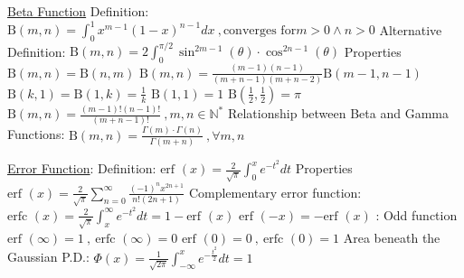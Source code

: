 \documentclass[12pt]{article}
\def\erf{\text{erf\ }} %
\def\erfc{\text{erfc\ }} %
\newcommand{\Beta}{\mathrm{B}} %
\begin{document}
\begin{flushleft}
	\uline{Beta Function} \linebreak 
	\textbullet \quad Definition: $\displaystyle \Beta (m,n) = \int_0^1 x^{m-1} (1-x)^{n-1} dx \ , \text{converges for} m>0 \land n >0$ \linebreak 
	\textbullet \quad Alternative Definition: $\displaystyle \Beta (m,n) = 2\int_0^{\pi/2} \sin ^{2m-1} (\theta) \cdot \cos ^{2n-1} (\theta)$ \linebreak 
	Properties \linebreak 
	\textbullet \quad $\Beta (m,n) = \Beta (n,m)$ \linebreak 
	\textbullet \quad $\displaystyle \Beta (m,n) = \frac{(m-1)(n-1)}{(m+n-1)(m+n-2)} \Beta (m-1,n-1) $ \linebreak 
	\textbullet \quad $\displaystyle \Beta (k,1) = \Beta (1,k) = \frac{1}{k}$ \linebreak 
	\textbullet \quad $\Beta(1,1) = 1$ \linebreak 
	\textbullet \quad $\displaystyle \Beta(\frac{1}{2} , \frac{1}{2} ) = \pi $ \linebreak 
	\textbullet \quad $\displaystyle \Beta (m,n) = \frac{(m-1)! (n-1)!}{(m+n-1)!} \ , m,n \in \mathbb{N}^*$ \linebreak 
	\textbullet \quad Relationship between Beta and Gamma Functions: \linebreak 
	$\displaystyle \Beta (m,n) = \frac{\Gamma(m) \cdot \Gamma (n)}{\Gamma (m+n)} \ , \forall m,n $ \linebreak 
	
	\uline{Error Function}: \linebreak 
	\textbullet \quad Definition: $\displaystyle \erf (x) = \frac{2}{\sqrt{\pi}} \int_0^x e^{-t^2} dt$ \linebreak 
	Properties \linebreak 
	\textbullet \quad $\displaystyle \erf (x) = \frac{2}{\sqrt{\pi}} \sum \limits_{n=0}^{\infty} \frac{(-1)^n x^{2n+1}}{n! (2n+1)} $ \linebreak 
	\textbullet \quad Complementary error function: $\displaystyle \erfc (x) = \frac{2}{\sqrt{\pi}} \int_x^{\infty} e^{-t^2} dt = 1 - \erf(x) $ \linebreak 
	\textbullet \quad $\erf (-x) = - \erf (x) $  :  Odd function \linebreak 
	\textbullet \quad $\erf (\infty) = 1 \ , \ \erfc (\infty) = 0 $ \linebreak 
	\textbullet \quad $\erf (0) = 0 \ , \ \erfc (0) = 1$ \linebreak 
	\textbullet \quad Area beneath the Gaussian P.D.: $\displaystyle \Phi (x) = \frac{1}{\sqrt{2\pi}} \int_{-\infty}^x e^{-\frac{t^2}{2}} dt = 1 $ \linebreak 
	

\end{flushleft}
\end{document}
